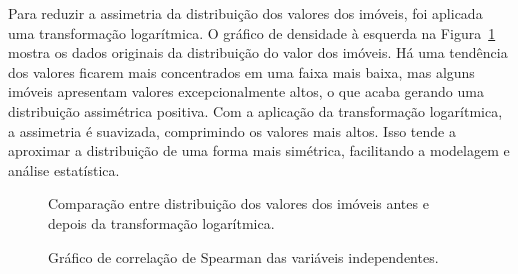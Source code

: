 \documentclass[
  12pt,
  a4paper,
]{scrreprt}
\begin{document}
\vspace{12pt}

Para reduzir a assimetria da distribuição dos valores dos imóveis, foi
aplicada uma transformação logarítmica. O gráfico de densidade à
esquerda na Figura~\ref{fig-densitarg} mostra os dados originais da
distribuição do valor dos imóveis. Há uma tendência dos valores ficarem
mais concentrados em uma faixa mais baixa, mas alguns imóveis apresentam
valores excepcionalmente altos, o que acaba gerando uma distribuição
assimétrica positiva. Com a aplicação da transformação logarítmica, a
assimetria é suavizada, comprimindo os valores mais altos. Isso tende a
aproximar a distribuição de uma forma mais simétrica, facilitando a
modelagem e análise estatística.

\begin{figure}


\caption{\label{fig-densitarg}Comparação entre distribuição dos valores
dos imóveis antes e depois da transformação logarítmica.}

\end{figure}%

\begin{figure}


\caption{\label{fig-corplot}Gráfico de correlação de Spearman das
variáveis independentes.}

\end{figure}%
\end{document}
